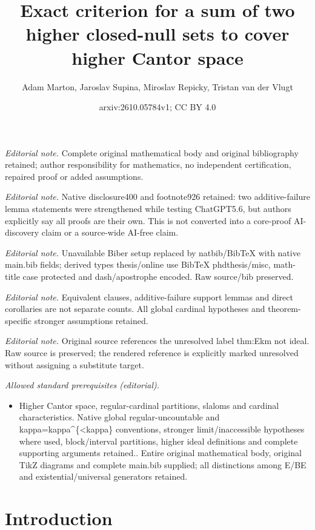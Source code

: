 \documentclass[10pt,a4paper]{amsart}
\title{Exact criterion for a sum of two higher closed-null sets to cover higher Cantor space}
\author{Adam Marton, Jaroslav Supina, Miroslav Repicky, Tristan van der Vlugt}
\date{arxiv:2610.05784v1; CC BY 4.0}
\theoremstyle{definition}
\begin{document}
\maketitle
\noindent\textit{Editorial note.} Complete original mathematical body and original bibliography retained; author responsibility for mathematics, no independent certification, repaired proof or added assumptions.\par\medskip
\noindent\textit{Editorial note.} Native disclosure400 and footnote926 retained: two additive-failure lemma statements were strengthened while testing ChatGPT5.6, but authors explicitly say all proofs are their own. This is not converted into a core-proof AI-discovery claim or a source-wide AI-free claim.\par\medskip
\noindent\textit{Editorial note.} Unavailable Biber setup replaced by natbib/BibTeX with native main.bib fields; derived types thesis/online use BibTeX phdthesis/misc, math-title case protected and dash/apostrophe encoded. Raw source/bib preserved.\par\medskip
\noindent\textit{Editorial note.} Equivalent clauses, additive-failure support lemmas and direct corollaries are not separate counts. All global cardinal hypotheses and theorem-specific stronger assumptions retained.\par\medskip
\noindent\textit{Editorial note.} Original source references the unresolved label thm:Ekm not ideal. Raw source is preserved; the rendered reference is explicitly marked unresolved without assigning a substitute target.\par\medskip
\noindent\textit{Allowed standard prerequisites (editorial).}\begin{itemize}
\item Higher Cantor space, regular-cardinal partitions, slaloms and cardinal characteristics. Native global regular-uncountable and kappa=kappa\textasciicircum{}\{<kappa\} conventions, stronger limit/inaccessible hypotheses where used, block/interval partitions, higher ideal definitions and complete supporting arguments retained.. Entire original mathematical body, original TikZ diagrams and complete main.bib supplied; all distinctions among E/BE and existential/universal generators retained.
\end{itemize}\medskip
	\section{Introduction}\label{sec:introduction}
	
\end{document}
